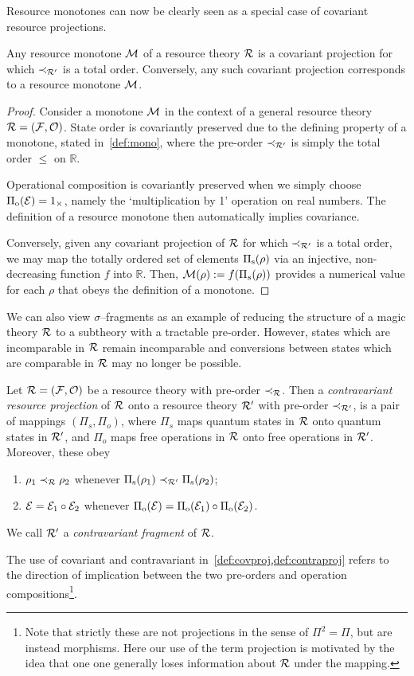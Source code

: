 \documentclass[pra,
aps,
twocolumn,
superscriptaddress,
groupedaddress,
nofootinbib,
reprint
]{revtex4-1}
\begin{document}
Resource monotones can now be clearly seen as a special case of covariant resource projections.
\begin{proposition}\label{thm:monoproj}
	Any resource monotone $\mathcal{M}$ of a resource theory $\mathcal{R}$ is a covariant projection for which $\prec_{\mathcal{R}'}$ is a total order. 
	Conversely, any such covariant projection corresponds to a resource monotone $\mathcal{M}$. 
\end{proposition}
\begin{proof}
	Consider a monotone $\mathcal{M}$ in the context of a general resource theory $\mathcal{R} = (\mathcal{F}, \mathcal{O})$.
	State order is covariantly preserved due to the defining property of a monotone, stated in~\cref{def:mono}, where the pre-order $\prec_{\mathcal{R}'}$ is simply the total order $\leq$ on $\mathbb{R}$. 
	
	Operational composition is covariantly preserved when we simply choose $\Pi_{\rm{o}}(\mathcal{E}) = 1_\times$, namely the `multiplication by 1' operation on real numbers. 
	The definition of a resource monotone then automatically implies covariance.
	
	Conversely, given any covariant projection of $\mathcal{R}$ for which $\prec_{\mathcal{R}'}$ is a total order, we may map the totally ordered set of elements $\Pi_{\rm{s}}(\rho)$ via an injective, non-decreasing function $f$ into $\mathbb{R}$. 
	Then, $\mathcal{M}(\rho):=f(\Pi_s(\rho))$ provides a numerical value for each $\rho$ that obeys the definition of a monotone.
	
\end{proof}

We can also view $\sigma$--fragments as an example of reducing the structure of a magic theory $\mathcal{R}$ to a subtheory with a tractable pre-order.
However, states which are incomparable in $\mathcal{R}$ remain incomparable and conversions between states which are comparable in $\mathcal{R}$ may no longer be possible.
\begin{definition}\label{def:contraproj}
	Let $\mathcal{R} = (\mathcal{F}, \mathcal{O})$ be a resource theory with pre-order $\prec_{\mathcal{R}}$. 
Then a \emph{contravariant resource projection} of $\mathcal{R}$ onto a resource theory $\mathcal{R}'$ with pre-order $\prec_{\mathcal{R}'}$, is a pair of mappings $(\Pi_s, \Pi_o)$, where $\Pi_s$ maps quantum states in $\mathcal{R}$ onto quantum states in $\mathcal{R}'$, and $\Pi_o$ maps free operations in $\mathcal{R}$ onto free operations in $\mathcal{R}'$. 
Moreover, these obey
	\begin{enumerate}
        \item $\rho_1 \prec_{\mathcal{R}} \rho_2$ whenever $\Pi_{\rm{s}}(\rho_1) \prec_{\mathcal{R}'} \Pi_{\rm{s}}(\rho_2)$;
        \item $\mathcal{E} = \mathcal{E}_1 \circ \mathcal{E}_2$ whenever $\Pi_{\rm{o}}(\mathcal{E}) = \Pi_{\rm{o}}(\mathcal{E}_1) \circ \Pi_{\rm{o}}(\mathcal{E}_2)$.
    \end{enumerate}
We call $\mathcal{R}'$ a \emph{contravariant fragment} of $\mathcal{R}$.
\end{definition}
The use of covariant and contravariant in~\cref{def:covproj,def:contraproj} refers to the direction of implication between the two pre-orders and operation compositions\footnote{Note that strictly these are not projections in the sense of $\Pi^2 = \Pi$, but are instead morphisms. 
Here our use of the term projection is motivated by the idea that one one generally loses information about $\mathcal{R}$ under the mapping.}.
\end{document}
